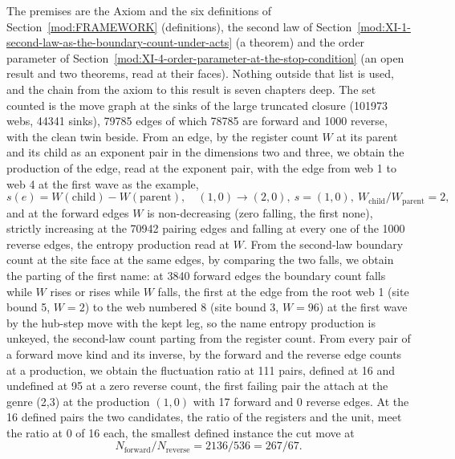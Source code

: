 \begin{chproof}[census]
The premises are the Axiom and the six definitions of Section~\ref{mod:FRAMEWORK} (definitions), the second law of Section~\ref{mod:XI-1-second-law-as-the-boundary-count-under-acts} (a theorem) and the order parameter of Section~\ref{mod:XI-4-order-parameter-at-the-stop-condition} (an open result and two theorems, read at their faces). Nothing outside that list is used, and the chain from the axiom to this result is seven chapters deep.
The set counted is the move graph at the sinks of the large truncated closure (101973 webs, 44341 sinks), 79785 edges of which 78785 are forward and 1000 reverse, with the clean twin beside. From an edge, by the register count $W$ at its parent and its child as an exponent pair in the dimensions two and three, we obtain the production of the edge, read at the exponent pair, with the edge from web 1 to web 4 at the first wave as the example,
\begin{equation}
s(e) = W(\text{child}) - W(\text{parent}), \quad (1,0) \to (2,0), \ s = (1,0), \ W_{\mathrm{child}} / W_{\mathrm{parent}} = 2 ,
\end{equation}
and at the forward edges $W$ is non-decreasing (zero falling, the first none), strictly increasing at the 70942 pairing edges and falling at every one of the 1000 reverse edges, the entropy production read at $W$. From the second-law boundary count at the site face at the same edges, by comparing the two falls, we obtain the parting of the first name: at 3840 forward edges the boundary count falls while $W$ rises or rises while $W$ falls, the first at the edge from the root web 1 (site bound 5, $W = 2$) to the web numbered 8 (site bound 3, $W = 96$) at the first wave by the hub-step move with the kept leg, so the name entropy production is unkeyed, the second-law count parting from the register count. From every pair of a forward move kind and its inverse, by the forward and the reverse edge counts at a production, we obtain the fluctuation ratio at 111 pairs, defined at 16 and undefined at 95 at a zero reverse count, the first failing pair the attach at the genre (2,3) at the production $(1,0)$ with 17 forward and 0 reverse edges. At the 16 defined pairs the two candidates, the ratio of the registers and the unit, meet the ratio at 0 of 16 each, the smallest defined instance the cut move at
\begin{equation}
N_{\mathrm{forward}} / N_{\mathrm{reverse}} = 2136 / 536 = 267 / 67 .
\end{equation}

\end{chproof}
